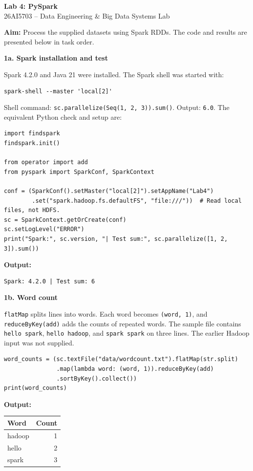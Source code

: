 \documentclass[10pt,a4paper]{article}
\newcommand{\task}[1]{\medskip\textbf{#1}\par}
\begin{document}
\begin{center}
{\Large\bfseries Lab 4: PySpark}\\[3pt]
26AI5703 -- Data Engineering \& Big Data Systems Lab
\end{center}
\textbf{Aim:} Process the supplied datasets using Spark RDDs.
The code and results are presented below in task order.

\task{1a. Spark installation and test}
Spark 4.2.0 and Java 21 were installed. The Spark shell was started with:
\begin{lstlisting}
spark-shell --master 'local[2]'
\end{lstlisting}
Shell command: \texttt{sc.parallelize(Seq(1, 2, 3)).sum()}. Output: \texttt{6.0}.
The equivalent Python check and setup are:
\begin{lstlisting}
import findspark
findspark.init()

from operator import add
from pyspark import SparkConf, SparkContext

conf = (SparkConf().setMaster("local[2]").setAppName("Lab4")
        .set("spark.hadoop.fs.defaultFS", "file:///"))  # Read local files, not HDFS.
sc = SparkContext.getOrCreate(conf)
sc.setLogLevel("ERROR")
print("Spark:", sc.version, "| Test sum:", sc.parallelize([1, 2, 3]).sum())
\end{lstlisting}
\textbf{Output:} \begin{lstlisting}
Spark: 4.2.0 | Test sum: 6
\end{lstlisting}

\task{1b. Word count}
\texttt{flatMap} splits lines into words. Each word becomes \texttt{(word, 1)},
and \texttt{reduceByKey(add)} adds the counts of repeated words.
The sample file contains \texttt{hello spark}, \texttt{hello hadoop}, and \texttt{spark spark}
on three lines. The earlier Hadoop input was not supplied.
\begin{lstlisting}
word_counts = (sc.textFile("data/wordcount.txt").flatMap(str.split)
               .map(lambda word: (word, 1)).reduceByKey(add)
               .sortByKey().collect())
print(word_counts)
\end{lstlisting}
\textbf{Output:}
\begin{center}
\begin{tabular}{lr}
\toprule
Word & Count \\
\midrule
hadoop & 1 \\
hello & 2 \\
spark & 3 \\
\bottomrule
\end{tabular}
\end{center}
\end{document}
